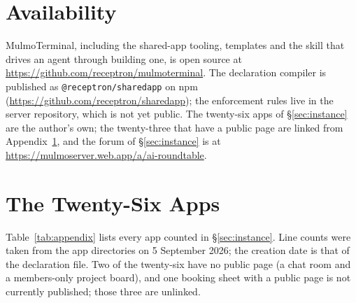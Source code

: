 \documentclass[11pt]{article}
\begin{document}
\section*{Availability}

{\sloppy
MulmoTerminal, including the shared-app tooling, templates and the skill that
drives an agent through building one, is open source at
\url{https://github.com/receptron/mulmoterminal}. The declaration compiler is
published as \texttt{@receptron/sharedapp} on npm
(\url{https://github.com/receptron/sharedapp}); the enforcement rules live in
the server repository, which is not yet public. The twenty-six apps of
\S\ref{sec:instance} are the author's own; the twenty-three that have a public
page are linked from Appendix~\ref{sec:appendix}, and the forum of
\S\ref{sec:instance} is at \url{https://mulmoserver.web.app/a/ai-roundtable}.
\par}




\appendix
\section{The Twenty-Six Apps}
\label{sec:appendix}

Table~\ref{tab:appendix} lists every app counted in \S\ref{sec:instance}. Line counts were taken from the app directories on 5 September 2026; the creation date is that of the declaration file. Two of the twenty-six have no public page (a chat room and a members-only project board), and one booking sheet with a public page is not currently published; those three are unlinked.


\end{document}

